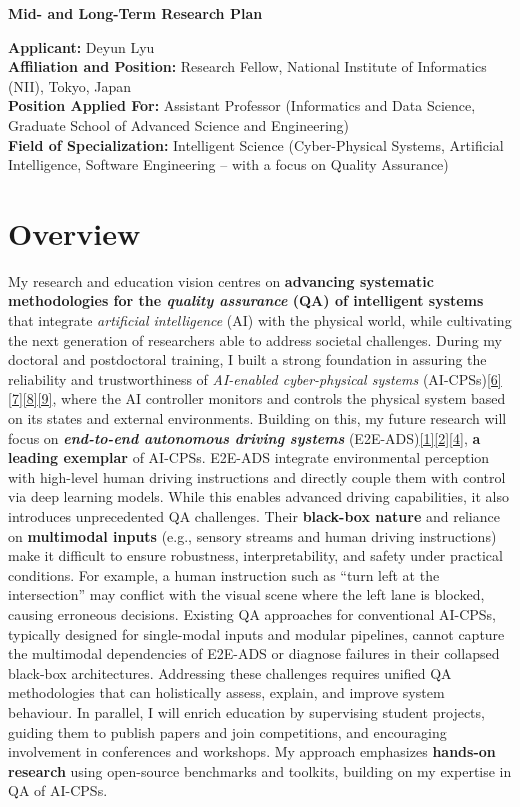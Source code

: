 \documentclass[12pt,a4paper]{article}
\begin{document}
\begin{center}
    \Large \textbf{Mid- and Long-Term Research Plan}
\end{center}

\noindent \textbf{Applicant:} Deyun Lyu \\
\textbf{Affiliation and Position:} Research Fellow, National Institute of Informatics (NII), Tokyo, Japan\\
\textbf{Position Applied For:} Assistant Professor (Informatics and Data Science, Graduate School of Advanced Science and Engineering)\\
\textbf{Field of Specialization:} Intelligent Science (Cyber-Physical Systems, Artificial Intelligence, Software Engineering – with a focus on Quality Assurance)

\section{Overview}

My research and education vision centres on \textbf{advancing systematic methodologies for the \emph{quality assurance} (QA) of intelligent systems} that integrate \emph{artificial intelligence} (AI) with the physical world, while cultivating the next generation of researchers able to address societal challenges. During my doctoral and postdoctoral training, I built a strong foundation in assuring the reliability and trustworthiness of \emph{AI-enabled cyber-physical systems} (AI-CPSs)\hyperlink{paper6}{[6]}\hyperlink{paper7}{[7]}\hyperlink{paper8}{[8]}\hyperlink{paper9}{[9]}, where the AI controller monitors and controls the physical system based on its states and external environments. Building on this, my future research will focus on \textbf{\emph{end-to-end autonomous driving systems}} (E2E-ADS)\hyperlink{paper1}{[1]}\hyperlink{paper2}{[2]}\hyperlink{paper4}{[4]}, \textbf{a leading exemplar} of AI-CPSs. E2E-ADS integrate environmental perception with high-level human driving instructions and directly couple them with control via deep learning models. While this enables advanced driving capabilities, it also introduces unprecedented QA challenges. Their \textbf{black-box nature} and reliance on \textbf{multimodal inputs} (e.g., sensory streams and human driving instructions) make it difficult to ensure robustness, interpretability, and safety under practical conditions. For example, a human instruction such as “turn left at the intersection” may conflict with the visual scene where the left lane is blocked, causing erroneous decisions. Existing QA approaches for conventional AI-CPSs, typically designed for single-modal inputs and modular pipelines, cannot capture the multimodal dependencies of E2E-ADS or diagnose failures in their collapsed black-box architectures. Addressing these challenges requires unified QA methodologies that can holistically assess, explain, and improve system behaviour. In parallel, I will enrich education by supervising student projects, guiding them to publish papers and join competitions, and encouraging involvement in conferences and workshops. My approach emphasizes \textbf{hands-on research} using open-source benchmarks and toolkits, building on my expertise in QA of AI-CPSs.
\end{document}
